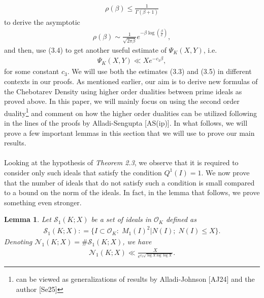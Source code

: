 \documentclass[12pt]{article}
\numberwithin{equation}{section}
\newtheorem{lemma}[theorem]{Lemma}
\numberwithin{equation}{section}
\begin{document}
\begin{align}
    \rho(\beta) \leq \frac{1}{\Gamma(\beta+1)} \nonumber
\end{align}
to derive the asymptotic
\begin{align}
    \rho(\beta) \sim \frac{1}{\sqrt{2\pi\beta}}e^{-\beta\log\left(\frac{\beta}{e}\right)},
\end{align}
and then, use (3.4) to get another useful estimate of $\Psi_K(X,Y)$, i.e.
\begin{align}
    \Psi_K(X,Y) \ll Xe^{-c_3\beta},
\end{align}
for some constant $c_3$. We will use both the estimates (3.3) and (3.5) in different contexts in our proofs. As mentioned earlier, our aim is to derive new formulas of the Chebotarev Density using higher order dualities between prime ideals as proved above. In this paper, we will mainly focus on using the second order duality\footnote[7]{can be viewed as generalizations of results by Alladi-Johnson [AJ24] and the author [Se25]} and comment on how the higher order dualities can be utilized following in the lines of the proofs by Alladi-Sengupta [AS(ip)]. In what follows, we will prove a few important lemmas in this section that we will use to prove our main results. \\ \\
Looking at the hypothesis of \textit{Theorem 2.3}, we observe that it is required to consider only such ideals that satisfy the condition $Q^1(I)=1$. We now prove that the number of ideals that do not satisfy such a condition is small compared to a bound on the norm of the ideals. In fact, in the lemma that follows, we prove something even stronger.
\begin{lemma}
    Let $\mathcal{S}_1(K;X)$ be a set of ideals in $\mathcal{O}_K$ defined as
    \begin{align}
        \mathcal{S}_1(K;X): = \{I \subset \mathcal{O}_K:\;M_1(I)^2|N(I);\;N(I)\leq X\}.
    \end{align}
    Denoting $\mathcal{N}_1(K;X) = \#\mathcal{S}_1(K;X)$, we have
    \begin{align}
        \mathcal{N}_1(K;X) \ll \frac{X}{e^{c_3\sqrt{\log X\log\log X}}}.
    \end{align}
\end{lemma}
\end{document}
